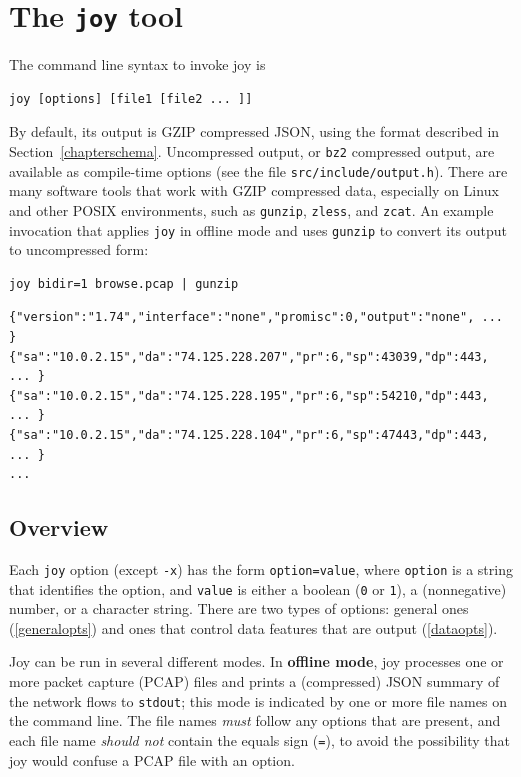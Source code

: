 \documentclass{book}
\begin{document}
\chapter{The \texttt{joy} tool}
\label{joytool}
The command line syntax to invoke joy is
\begin{mdframed}[style=aaa]
  \begin{verbatim}
joy [options] [file1 [file2 ... ]]
  \end{verbatim}
\end{mdframed}
By default, its output is GZIP compressed JSON, using the format
described in Section~\ref{chapterschema}.  Uncompressed output, or
\texttt{bz2} compressed output, are available as compile-time options
(see the file \texttt{src/include/output.h}).  There are many software
tools that work with GZIP compressed data, especially on Linux and
other POSIX environments, such as \texttt{gunzip}, \texttt{zless}, and
\texttt{zcat}.   An example invocation that applies \texttt{joy} in offline mode and
uses \texttt{gunzip} to convert its output to uncompressed form:
\begin{mdframed}[style=cli]
\begin{verbatim}
joy bidir=1 browse.pcap | gunzip 
\end{verbatim}
\begin{verbatim}
{"version":"1.74","interface":"none","promisc":0,"output":"none", ... }
{"sa":"10.0.2.15","da":"74.125.228.207","pr":6,"sp":43039,"dp":443, ... }
{"sa":"10.0.2.15","da":"74.125.228.195","pr":6,"sp":54210,"dp":443, ... }
{"sa":"10.0.2.15","da":"74.125.228.104","pr":6,"sp":47443,"dp":443, ... }
...
\end{verbatim}
\end{mdframed}

\section{Overview}
Each \texttt{joy} option (except \texttt{-x}) has the form \texttt{option=value},
where \texttt{option} is a string that identifies the option, and
\texttt{value} is either a boolean (\texttt{0} or \texttt{1}), a
(nonnegative) number, or a character string.  There are two types of options:
general ones (\ref{generalopts}) and ones that control data features
that are output (\ref{dataopts}).

Joy can be run in several different modes.   In \textbf{offline mode},
joy processes one or more packet capture (PCAP) files and prints
a (compressed) JSON summary of the network flows to \texttt{stdout};
this mode is indicated by one or more file names on the command line.
The file names \textit{must} follow any options that are present,
and each file name \textit{should not} contain the equals sign
(\texttt{=}), to avoid the possibility that joy would
confuse a PCAP file with an option.  
\end{document}
